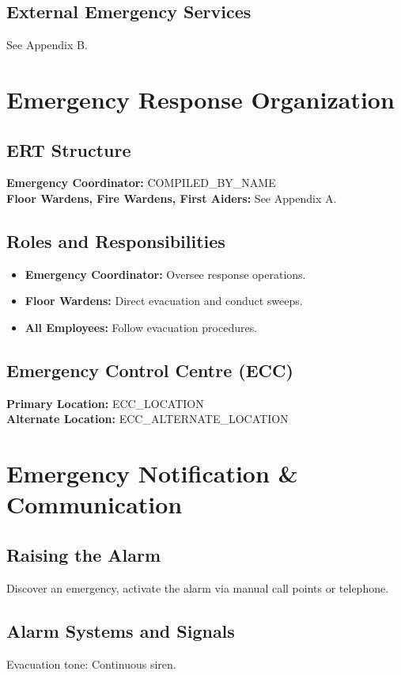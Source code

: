 \documentclass[11pt]{article}
\newcommand{\compilerName}{{{COMPILED_BY_NAME}}}
\begin{document}
\subsection{External Emergency Services}
See Appendix B.

\section{Emergency Response Organization}

\subsection{ERT Structure}
\textbf{Emergency Coordinator:} \compilerName \\
\textbf{Floor Wardens, Fire Wardens, First Aiders:} See Appendix A.

\subsection{Roles and Responsibilities}
\begin{itemize}
    \item \textbf{Emergency Coordinator:} Oversee response operations.
    \item \textbf{Floor Wardens:} Direct evacuation and conduct sweeps.
    \item \textbf{All Employees:} Follow evacuation procedures.
\end{itemize}

\subsection{Emergency Control Centre (ECC)}
\textbf{Primary Location:} {{ECC_LOCATION}} \\
\textbf{Alternate Location:} {{ECC_ALTERNATE_LOCATION}}

\section{Emergency Notification \& Communication}

\subsection{Raising the Alarm}
Discover an emergency, activate the alarm via manual call points or telephone.

\subsection{Alarm Systems and Signals}
Evacuation tone: Continuous siren.
\end{document}
